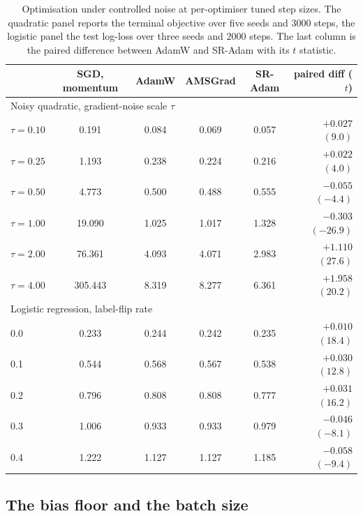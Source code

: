 \documentclass[a4paper,fleqn]{cas-sc}
\theoremstyle{plain}
\theoremstyle{definition}
\theoremstyle{remark}
\begin{document}
\begin{table}%
\centering
\caption{Optimisation under controlled noise at per-optimiser tuned step sizes. The quadratic panel reports the terminal objective over five seeds and $3000$ steps, the logistic panel the test log-loss over three seeds and $2000$ steps. The last column is the paired difference between AdamW and SR-Adam with its $t$ statistic.}
\label{tab:opt_noise}
\footnotesize\setlength{\tabcolsep}{3.5pt}
\begin{tabular}{lccccr}
\toprule
 & SGD, momentum & AdamW & AMSGrad & SR-Adam & paired diff ($t$) \\
\midrule
\multicolumn{6}{l}{Noisy quadratic, gradient-noise scale $\tau$} \\
$\tau=0.10$ & 0.191 & 0.084 & 0.069 & 0.057 & $+0.027$ $(9.0)$ \\
$\tau=0.25$ & 1.193 & 0.238 & 0.224 & 0.216 & $+0.022$ $(4.0)$ \\
$\tau=0.50$ & 4.773 & 0.500 & 0.488 & 0.555 & $-0.055$ $(-4.4)$ \\
$\tau=1.00$ & 19.090 & 1.025 & 1.017 & 1.328 & $-0.303$ $(-26.9)$ \\
$\tau=2.00$ & 76.361 & 4.093 & 4.071 & 2.983 & $+1.110$ $(27.6)$ \\
$\tau=4.00$ & 305.443 & 8.319 & 8.277 & 6.361 & $+1.958$ $(20.2)$ \\
\midrule
\multicolumn{6}{l}{Logistic regression, label-flip rate} \\
0.0 & 0.233 & 0.244 & 0.242 & 0.235 & $+0.010$ $(18.4)$ \\
0.1 & 0.544 & 0.568 & 0.567 & 0.538 & $+0.030$ $(12.8)$ \\
0.2 & 0.796 & 0.808 & 0.808 & 0.777 & $+0.031$ $(16.2)$ \\
0.3 & 1.006 & 0.933 & 0.933 & 0.979 & $-0.046$ $(-8.1)$ \\
0.4 & 1.222 & 1.127 & 1.127 & 1.185 & $-0.058$ $(-9.4)$ \\
\bottomrule
\end{tabular}
\end{table}

\subsection{The bias floor and the batch size}
\end{document}
